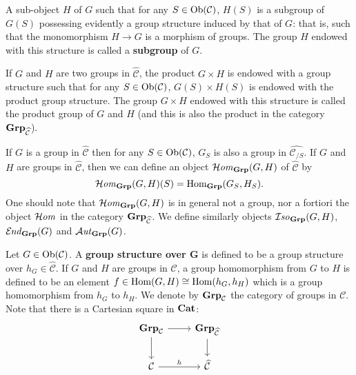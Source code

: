 A sub-object $H$ of $G$ such that for any $S\in\mathrm{Ob}(\mathcal{C})$, $H(S)$ is a subgroup of $G(S)$ possessing evidently a group structure induced by that of $G$: that is, such that the monomorphism $H\to G$ is a morphism of groups. The group $H$ endowed with this structure is called a \textbf{subgroup} of $G$.\par
If $G$ and $H$ are two groups in $\widehat{\mathcal{C}}$, the product $G\times H$ is endowed with a group structure such that for any $S\in\mathrm{Ob}(\mathcal{C})$, $G(S)\times H(S)$ is endowed with the product group structure. The group $G\times H$ endowed with this structure is called the product group of $G$ and $H$ (and this is also the product in the category $\mathbf{Grp}_{\widehat{\mathcal{C}}}$).\par
If $G$ is a group in $\widehat{\mathcal{C}}$ then for any $S\in\mathrm{Ob}(\mathcal{C})$, $G_S$ is also a group in $\widehat{\mathcal{C}_{/S}}$. If $G$ and $H$ are groups in $\widehat{\mathcal{C}}$, then we can define an object $\operatorname{\mathcal{H}\hspace*{-0.4pt}\textit{om}\hspace{0.5pt}}_{\mathbf{Grp}}(G,H)$ of $\widehat{\mathcal{C}}$ by
\[\operatorname{\mathcal{H}\hspace*{-0.4pt}\textit{om}\hspace{0.5pt}}_{\mathbf{Grp}}(G,H)(S)=\mathrm{Hom}_{\mathbf{Grp}}(G_S,H_S).\]
One should note that $\operatorname{\mathcal{H}\hspace*{-0.4pt}\textit{om}\hspace{0.5pt}}_{\mathbf{Grp}}(G,H)$ is in general not a group, nor a fortiori the object $\operatorname{\mathcal{H}\hspace*{-0.4pt}\textit{om}\hspace{0.5pt}}$ in the category $\mathbf{Grp}_{\widehat{\mathcal{C}}}$. We define similarly objects $\operatorname{\mathcal{I}\hspace*{-0.5pt}\textit{so}\hspace{0.5pt}}_{\mathbf{Grp}}(G,H)$, $\operatorname{\mathcal{E}\hspace*{-1pt}\textit{nd}\hspace{0.5pt}}_{\mathbf{Grp}}(G)$ and $\operatorname{\mathcal{A}\hspace*{-0.2pt}\textit{ut}\hspace{0.5pt}}_{\mathbf{Grp}}(G)$.

\begin{definition}
Let $G\in\mathrm{Ob}(\mathcal{C})$. A \textbf{group structure over $\bm{G}$} is defined to be a group structure over $h_G\in\widehat{\mathcal{C}}$. If $G$ and $H$ are groups in $\mathcal{C}$, a group homomorphism from $G$ to $H$ is defined to be an element $f\in\mathrm{Hom}(G,H)\cong\mathrm{Hom}(h_G,h_H)$ which is a group homomorphism from $h_G$ to $h_H$. We denote by $\mathbf{Grp}_{\mathcal{C}}$ the category of groups in $\mathcal{C}$. Note that there is a Cartesian square in $\mathbf{Cat}$:
\[\begin{tikzcd}
\Grp_{\mathcal{C}}\ar[r]\ar[d]&\Grp_{\widehat{\mathcal{C}}}\ar[d]\\
\mathcal{C}\ar[r,"h"]&\widehat{\mathcal{C}}
\end{tikzcd}\]
\end{definition}

